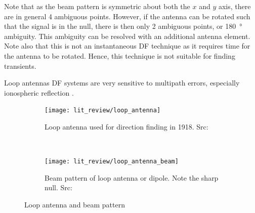 Note that as the beam pattern is symmetric about both the \(x\) and \(y\) axis, there are in general 4 ambiguous points. However, if the antenna can be rotated such that the signal is in the null, there is then only 2 ambiguous points, or \SI{180}{\degree} ambiguity. This ambiguity can be resolved with an  additional antenna element. Note also that this is not an instantaneous DF technique as it requires time for the antenna to be rotated. Hence, this technique is not suitable for finding transients. 

Loop antennas DF systems are very sensitive to multipath errors, especially ionospheric reflection \cite{jenkins1991smallaperture}. 
\begin{figure}
  \centering
  \begin{subfigure}[b]{0.48\textwidth}
    \centering
    \texttt{[image: lit\_review/loop\_antenna]}
    \caption{Loop antenna used for direction finding in 1918. Src: \cite{grabau1989funkpeiltechnik}}
  \end{subfigure}
  ~
  \begin{subfigure}[b]{0.48\textwidth}
    \centering
   \texttt{[image: lit\_review/loop\_antenna\_beam]}
   \caption{Beam pattern of loop antenna or dipole. Note the sharp null. Src: \cite{jenkins1991smallaperture}}
  \end{subfigure}
  \caption{Loop antenna and beam pattern}
  \label{fig:lit_loop_antenna}
\end{figure}

